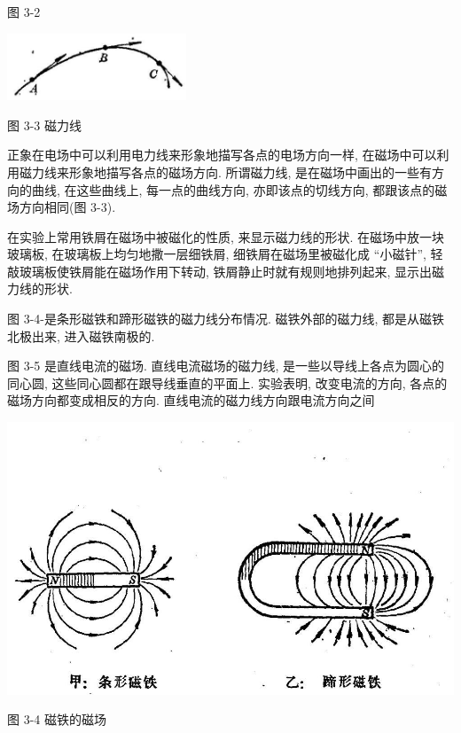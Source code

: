 \documentclass[10pt]{article}
\begin{document}
图 3-2

\begin{center}
\includegraphics[max width=0.4\textwidth]{images/01913056-1f15-74d8-9184-9aab52c9d66b_104_202830.jpg}
\end{center}

图 3-3 磁力线

正象在电场中可以利用电力线来形象地描写各点的电场方向一样, 在磁场中可以利用磁力线来形象地描写各点的磁场方向. 所谓磁力线, 是在磁场中画出的一些有方向的曲线, 在这些曲线上, 每一点的曲线方向, 亦即该点的切线方向, 都跟该点的磁场方向相同(图 3-3).

在实验上常用铁屑在磁场中被磁化的性质, 来显示磁力线的形状. 在磁场中放一块玻璃板, 在玻璃板上均匀地撒一层细铁屑, 细铁屑在磁场里被磁化成 “小磁针”, 轻敲玻璃板使铁屑能在磁场作用下转动, 铁屑静止时就有规则地排列起来, 显示出磁力线的形状.

图 3-4-是条形磁铁和蹄形磁铁的磁力线分布情况. 磁铁外部的磁力线, 都是从磁铁北极出来, 进入磁铁南极的.

图 3-5 是直线电流的磁场. 直线电流磁场的磁力线, 是一些以导线上各点为圆心的同心圆, 这些同心圆都在跟导线垂直的平面上. 实验表明, 改变电流的方向, 各点的磁场方向都变成相反的方向. 直线电流的磁力线方向跟电流方向之间

\begin{center}
\includegraphics[max width=1.0\textwidth]{images/01913056-1f15-74d8-9184-9aab52c9d66b_105_956289.jpg}
\end{center}

图 3-4 磁铁的磁场
\end{document}
